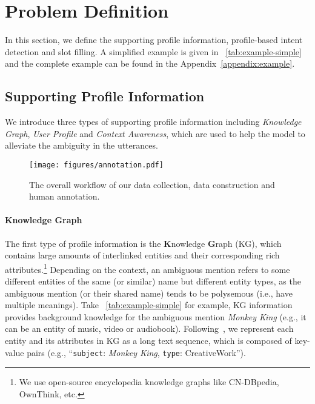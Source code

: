 \documentclass[letterpaper]{article} \usepackage{aaai22}  \usepackage{times}  \usepackage{helvet}  \usepackage{courier}  \usepackage[hyphens]{url}  \usepackage{graphicx} \urlstyle{rm} \def\UrlFont{\rm}  \usepackage{natbib}  \usepackage{caption} \DeclareCaptionStyle{ruled}{labelfont=normalfont,labelsep=colon,strut=off} \frenchspacing  \setlength{\pdfpagewidth}{8.5in}  \setlength{\pdfpageheight}{11in}  \usepackage{algorithm}
\begin{document}
\section{Problem Definition}
\label{PD}
In this section, we define the supporting profile information, profile-based intent detection and slot filling.
A simplified example is given in \tablename~\ref{tab:example-simple} and the complete example can be found in the Appendix~\ref{appendix:example}.

\subsection{Supporting Profile Information}
\label{sec:info_definition}
We introduce three types of supporting profile information including \textit{Knowledge Graph}, \textit{User Profile} and \textit{Context Awareness}, which are used to help the model to alleviate the ambiguity in the utterances.


\begin{figure*}[t]
	\centering
	\texttt{[image: figures/annotation.pdf]}
	\caption{
        The overall workflow of our data collection, data construction and human annotation. 
    }
	\label{fig:workflow}
\end{figure*}

\paragraph{Knowledge Graph}
The first type of profile information is the \textbf{K}nowledge \textbf{G}raph (KG), which contains large amounts of interlinked entities and their corresponding rich attributes.\footnote{We use open-source encyclopedia knowledge graphs like {CN-DBpedia}, {OwnThink}, etc.}
Depending on the context, an ambiguous mention refers to some different entities of the same (or similar) name but different entity types, as the ambiguous mention (or their shared name) tends to be polysemous (i.e., have multiple meanings).
Take \tablename~\ref{tab:example-simple} for example, KG information provides background knowledge for the ambiguous mention \textit{Monkey King} (e.g., it can be an entity of music, video or audiobook).
Following~\citet{Chen2020TabFact}, we represent each entity and its attributes in KG as a long text sequence, which is composed of key-value pairs (e.g., ``\texttt{subject}: \textit{Monkey King}, \texttt{type}: CreativeWork''). 
\end{document}
